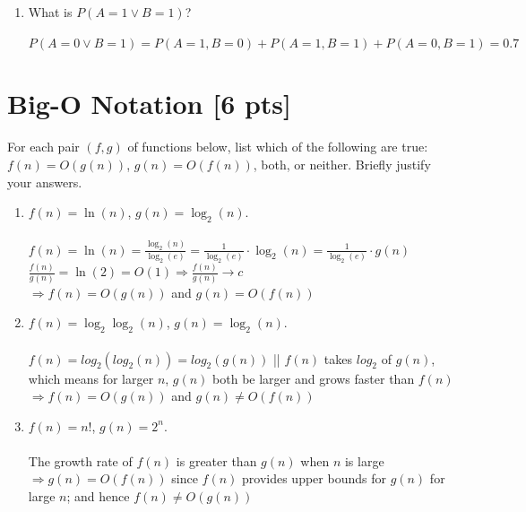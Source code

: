 \documentclass[a4paper]{article}
\theoremstyle{definition}
\newenvironment{soln}{
	\leavevmode\color{blue}\ignorespaces
}{}
\begin{document}
\begin{enumerate}
\begin{enumerate}
			\item 	What is $P(A = 1 \vee B = 1 )$?\\
		    \begin{soln}
				$P(A=0 \vee B=1) = P(A=1,B=0) + P(A=1,B=1) + P(A=0,B=1) = 0.7$
			\end{soln}
		\end{enumerate}
	\end{enumerate}
	
	
	\section{Big-O Notation [6 pts]}
	For each pair $(f, g)$ of functions below, list which of the following
	are true: $f(n) = O(g(n))$, $g(n) = O(f(n))$, both, or
	neither. Briefly justify your answers.
	\begin{enumerate}
		\item 	$f(n) = \ln(n)$, $g(n) = \log_{2}(n)$.\\
		\begin{soln}\\
		$f(n) = \ln(n) = \frac{\log_{2}(n)}{\log_{2}(e)} = \frac{1}{\log_{2}(e)} \cdot \log_{2}(n) = \frac{1}{\log_{2}(e)} \cdot g(n)$ \\
		$\frac{f(n)}{g(n)} = \ln(2) = O(1) \Rightarrow \frac{f(n)}{g(n)} \rightarrow c$\\
		$\Rightarrow f(n) = O(g(n))$ and $g(n) = O(f(n))$
		\end{soln}
		
		\item 	$f(n) =  \log_{2}\log_{2}(n)$, $g(n) = \log_{2}(n)$.\\
		\begin{soln}\\
		$f(n) = log_2(log_2(n)) = log_2(g(n))$ || $f(n)$ takes $log_2$ of $g(n)$, which means for larger $n$, $g(n)$ both be larger and grows faster than $f(n)$\\
		$\Rightarrow f(n) = O(g(n))$ and $g(n) \neq O(f(n))$
		\end{soln}
		
		\item 	$f(n) = n!$, $g(n) = 2^n$.\\
		\begin{soln}\\
		The growth rate of $f(n)$ is greater than $g(n)$ when $n$ is large \\
		$\Rightarrow g(n) = O(f(n)) $ since $f(n)$ provides upper bounds for $g(n)$ for large $n$; and hence  $f(n) \neq O(g(n))$ \end{soln}
	\end{enumerate}
	
\end{document}
